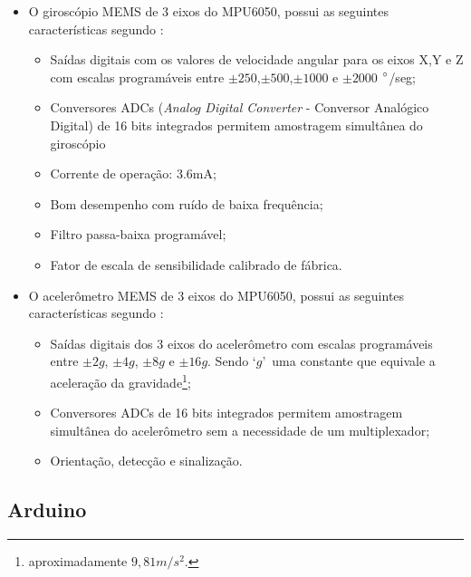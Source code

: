	\begin{description}
		\item[Características do MPU6050]  
		\item \begin{itemize}	 
		
		\item O giroscópio MEMS de 3 eixos do MPU6050, possui as seguintes características segundo \cite{mpu6050}:
			\begin{itemize}
				\item Saídas digitais com os valores de velocidade angular para os eixos X,Y e Z com escalas programáveis entre $ \pm250 $,$ \pm500 $,$ \pm1000 $ e $ \pm 2000$ $\degree$/seg;
				\item Conversores ADCs (\textit{Analog Digital Converter} - Conversor Analógico Digital) de 16 bits integrados permitem amostragem simultânea do giroscópio
				\item Corrente de operação: 3.6mA;
				\item Bom desempenho com ruído de baixa frequência;
				\item Filtro passa-baixa programável;
				\item Fator de escala de sensibilidade calibrado de fábrica.
			\end{itemize}
			
		\item O acelerômetro MEMS de 3 eixos do MPU6050, possui as seguintes características segundo \cite{mpu6050}:
			\begin{itemize}
				\item Saídas digitais dos 3 eixos do acelerômetro com escalas programáveis entre $\pm2g$, $\pm4g$, $\pm8g$ e $\pm16g$. Sendo \textquoteleft$ g$\textquoteright \ uma constante que equivale a aceleração da gravidade\footnote{aproximadamente $9,81 m/s^2 $.};
				\item Conversores ADCs de 16 bits integrados permitem amostragem simultânea do acelerômetro sem a necessidade de um multiplexador;
				\item Orientação, detecção e sinalização.
				
			\end{itemize}
		\end{itemize}
	\end{description}
	
	
	

\subsection{Arduino}

